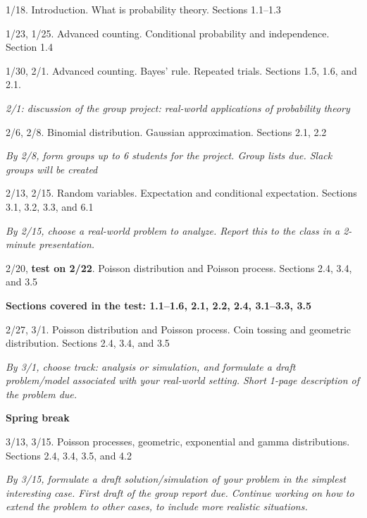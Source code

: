 \documentclass[oneside,11pt]{amsart}
\begin{document}
\begin{enumerate}[\bf{}{[}week 1{]}]
	\item 1/18. Introduction. What is probability theory. Sections 1.1--1.3

	\item 1/23, 1/25. Advanced counting. Conditional probability and independence. Section 1.4

	\item 1/30, 2/1. Advanced counting. Bayes' rule. Repeated trials. Sections 1.5, 1.6, and 2.1.

		\emph{2/1: discussion of the group project: real-world applications of probability theory}
		
	\item 2/6, 2/8. Binomial distribution. Gaussian approximation. Sections 2.1, 2.2

		\emph{By 2/8, form groups up to 6 students for the project. Group lists due. Slack groups will be created}

	\item 2/13, 2/15. Random variables. Expectation and conditional expectation. Sections 3.1, 3.2, 3.3, and 6.1

		\emph{By 2/15, choose a real-world problem to analyze. Report this to the class in a 2-minute presentation.}

	\item 2/20, \textbf{test on 2/22}. Poisson distribution and Poisson process. Sections 2.4, 3.4, and 3.5

		\textbf{Sections covered in the test: 1.1--1.6, 2.1, 2.2, 2.4, 3.1--3.3, 3.5}

	\item 2/27, 3/1. Poisson distribution and Poisson process. Coin tossing and geometric distribution. 
		Sections 2.4, 3.4, and 3.5
		
		\emph{By 3/1, choose track: analysis or simulation, and formulate a draft problem/model 
		associated with your real-world setting.
		Short 1-page description of the problem due.}

		\textbf{Spring break}

	\item 3/13, 3/15. 
		Poisson processes, geometric, exponential and gamma distributions. Sections 2.4, 3.4, 3.5, and 4.2

		\emph{By 3/15, formulate a draft solution/simulation of your problem in the
		simplest interesting case. 
		First draft of the group report due.
		Continue working on how to extend the problem to other cases, to include more realistic situations.}


\end{enumerate}
\end{document}
